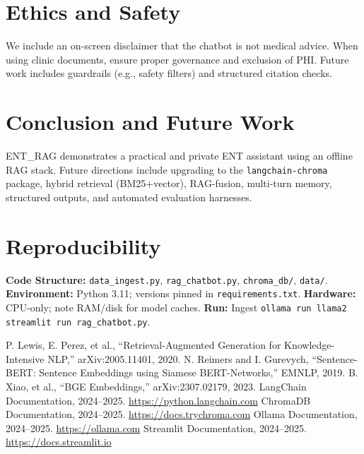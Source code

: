\documentclass[conference]{IEEEtran}
\begin{document}
\section{Ethics and Safety}
We include an on-screen disclaimer that the chatbot is not medical advice. When using clinic documents, ensure proper governance and exclusion of PHI. Future work includes guardrails (e.g., safety filters) and structured citation checks.

\section{Conclusion and Future Work}
ENT\_RAG demonstrates a practical and private ENT assistant using an offline RAG stack. Future directions include upgrading to the \texttt{langchain-chroma} package, hybrid retrieval (BM25+vector), RAG-fusion, multi-turn memory, structured outputs, and automated evaluation harnesses.

\section*{Reproducibility}
\textbf{Code Structure:} \texttt{data\_ingest.py}, \texttt{rag\_chatbot.py}, \texttt{chroma\_db/}, \texttt{data/}.\newline
\textbf{Environment:} Python 3.11; versions pinned in \texttt{requirements.txt}.\newline
\textbf{Hardware:} CPU-only; note RAM/disk for model caches.\newline
\textbf{Run:} Ingest \textrightarrow{} \texttt{ollama run llama2} \textrightarrow{} \texttt{streamlit run rag\_chatbot.py}.

\begin{thebibliography}{00}
 P. Lewis, E. Perez, et al., ``Retrieval-Augmented Generation for Knowledge-Intensive NLP,'' arXiv:2005.11401, 2020.
 N. Reimers and I. Gurevych, ``Sentence-BERT: Sentence Embeddings using Siamese BERT-Networks,'' EMNLP, 2019.
 B. Xiao, et al., ``BGE Embeddings,'' arXiv:2307.02179, 2023.
 LangChain Documentation, 2024--2025. \url{https://python.langchain.com}
 ChromaDB Documentation, 2024--2025. \url{https://docs.trychroma.com}
 Ollama Documentation, 2024--2025. \url{https://ollama.com}
 Streamlit Documentation, 2024--2025. \url{https://docs.streamlit.io}
\end{thebibliography}
\end{document}
